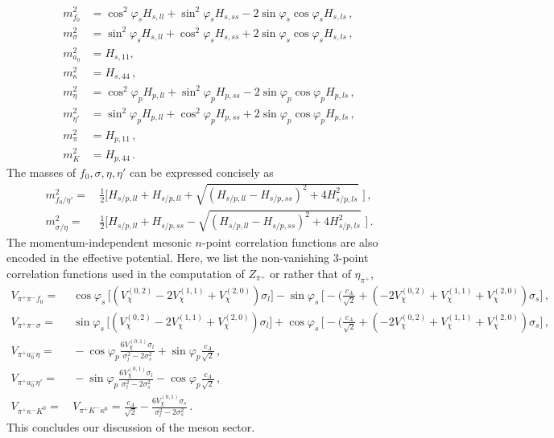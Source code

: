 \documentclass[reprint,twocolumn,superscriptaddress,preprintnumbers,amsmath,amssymb,aps,prd,floatfix]{revtex4-2}
\begin{document}
\begin{align}\nonumber
m_{f_0}^2&=\cos^2\varphi_s H_{s,ll}+\sin^2 \varphi_s H_{s,ss}-2 \sin \varphi_s \cos \varphi_s H_{s,ls}\,,\\[.5ex]\nonumber 
m_{\sigma}^2&=\sin^2\varphi_s H_{s,ll}+\cos^2 \varphi_s H_{s,ss}+2 \sin \varphi_s \cos \varphi_s H_{s,ls}\,,\\[.5ex]\nonumber 
m_{a_0}^2&=H_{s,11},\\[.5ex]\nonumber 
m_{\kappa}^2&=H_{s,44}\,,\\[.5ex]\nonumber 
m_{\eta}^2&=\cos^2\varphi_p H_{p,ll}+\sin^2 \varphi_p H_{p,ss}-2 \sin \varphi_p \cos \varphi_p H_{p,ls}\,,\\[.5ex]\nonumber 
m_{\eta'}^2&=\sin^2\varphi_p H_{p,ll}+\cos^2 \varphi_p H_{p,ss}+2 \sin \varphi_p \cos \varphi_p H_{p,ls}\,,\\[.5ex]\nonumber 
m_{\pi}^2&=H_{p,11}\,,\\[.5ex]
m_{K}^2&=H_{p,44}\,.
\label{eq:AllMesonMasses}
\end{align}
%
The masses of $f_0, \sigma, \eta,\eta'$ can be expressed concisely as  
%
\begin{align}\nonumber 
m_{f_0/\eta'}^2=&\, \frac12 \Biggl[ H_{s/p,ll}+H_{s/p,ll}+\sqrt{(H_{s/p,ll}-H_{s/p,ss})^2+4 H_{s/p,ls}^2}\,\, \Biggr]\,,\\[2ex]
m_{\sigma/\eta}^2=&\, \frac12 \Biggl[ H_{s/p,ll}+H_{s/p,ss}-\sqrt{(H_{s/p,ll}-H_{s/p,ss})^2+4 H_{s/p,ls}^2}\,\, \Biggr]\,.
\end{align}
%
The momentum-independent mesonic $n$-point correlation functions are also encoded in the effective potential. Here, we list the non-vanishing 3-point correlation functions used in the computation of $Z_{\pi^+}$ or rather that of  $\eta_{\pi^+}$, 
%
\begin{align}\nonumber 
V_{\pi^{+} \pi^{-} f_0}=&\, \cos\varphi_s\, \Big[ (V_\chi^{(0,2)} - 2 V_\chi^{(1,1)} + V_\chi^{(2,0)}) \sigma_l \Big]- \sin\varphi_s \,\Big[-(\frac{c_A}{\sqrt{2}} + (-2 V_\chi^{(0,2)} + V_\chi^{(1,1)} + V_\chi^{(2,0)}) \sigma_s \Big] \,,\\[2ex]\nonumber 
V_{\pi^{+} \pi^{-} \sigma}=&\,  \sin\varphi_s \,\Big[ (V_\chi^{(0,2)} - 2 V_\chi^{(1,1)} + V_\chi^{(2,0)}) \sigma_l \Big] + \cos\varphi_s \, \Big[-(\frac{c_A}{\sqrt{2}} + (-2 V_\chi^{(0,2)} + V_\chi^{(1,1)} + V_\chi^{(2,0)}) \sigma_s \Big] \,,\\[2ex]\nonumber 
V_{\pi^{+} a_0^{-} \eta}=&\,  -\cos\varphi_p\frac{6 V_\chi^{(0,1)} \sigma_l}{\sigma_l^2 - 2 \sigma_s^2}+ \sin\varphi_p \frac{c_A}{\sqrt{2}}\,,\\[2ex]\nonumber 
V_{\pi^{+} a_0^{-} \eta'}= & \, -\sin\varphi_p\frac{6 V_\chi^{(0,1)} \sigma_l}{\sigma_l^2 - 2 \sigma_s^2} - \cos\varphi_p \frac{c_A}{\sqrt{2}}\,,\\[1ex]
V_{\pi^{+} \kappa^{-} K^0} = &\,  V_{\pi^{+}K^{-}\kappa^0} = \frac{c_A}{\sqrt{2}} - \frac{6 V_\chi^{(0,1)} \sigma_s}{\sigma_l^2 - 2 \sigma_s^2}\,.
\end{align}
%
This concludes our discussion of the meson sector. 
\end{document}
